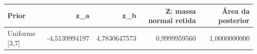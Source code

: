 \begin{tabular}{lrrrr}
\toprule
Prior & z\_a & z\_b & Z: massa normal retida & Área da posterior \\
\midrule
Uniforme [3,7] & -4,5139994197 & 4,7830647573 & 0,9999959560 & 1,0000000000 \\
\bottomrule
\end{tabular}
